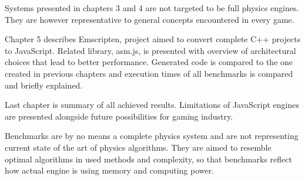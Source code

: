 Systems presented in chapters 3 and 4 are not targeted to be full physics engines. They are however representative to general concepts encountered in every game.

Chapter 5 describes Emscripten, project aimed to convert complete C++ projects to JavaScript. Related library, asm.js, is presented with overview of architectural choices that lead to better performance. Generated code is compared to the one created in previous chapters and execution times of all benchmarks is compared and briefly explained.

Last chapter is summary of all achieved results. Limitations of JavaScript engines are presented alongside future possibilities for gaming industry. 

Benchmarks are by no means a complete physics system and are not representing current state of the art of physics algorithms. They are aimed to resemble optimal algorithms in used methods and complexity, so that benchmarks reflect how actual engine is using memory and computing power.

